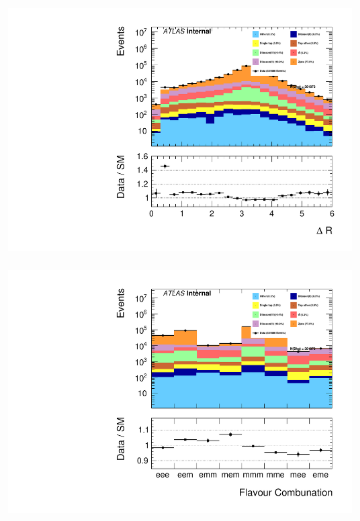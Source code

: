 \begin{figure}
{\begin{subfigure}{.425\textwidth}
        \includegraphics[width=\textwidth]{Figures/FeaturesHistograms/deltaR.pdf}
        \caption{}
        \label{fig:deltaR}
    \end{subfigure}
    \hfill
    \begin{subfigure}{.425\textwidth}
        \includegraphics[width=\textwidth]{Figures/FeaturesHistograms/flcomp.pdf}
        \caption{}
        \label{fig:flcomp}
    \end{subfigure}
    }
\end{figure}
